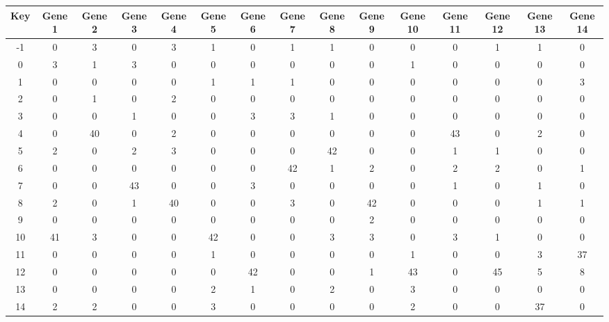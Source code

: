 \begin{tabular}{|c|c|c|c|c|c|c|c|c|c|c|c|c|c|c|}
\hline
Key & Gene 1 & Gene 2 & Gene 3 & Gene 4 & Gene 5 & Gene 6 & Gene 7 & Gene 8 & Gene 9 & Gene 10 & Gene 11 & Gene 12 & Gene 13 & Gene 14 \\
\hline
-1 & 0 & 3 & 0 & 3 & 1 & 0 & 1 & 1 & 0 & 0 & 0 & 1 & 1 & 0 \\
0 & 3 & 1 & 3 & 0 & 0 & 0 & 0 & 0 & 0 & 1 & 0 & 0 & 0 & 0 \\
1 & 0 & 0 & 0 & 0 & 1 & 1 & 1 & 0 & 0 & 0 & 0 & 0 & 0 & 3 \\
2 & 0 & 1 & 0 & 2 & 0 & 0 & 0 & 0 & 0 & 0 & 0 & 0 & 0 & 0 \\
3 & 0 & 0 & 1 & 0 & 0 & 3 & 3 & 1 & 0 & 0 & 0 & 0 & 0 & 0 \\
4 & 0 & 40 & 0 & 2 & 0 & 0 & 0 & 0 & 0 & 0 & 43 & 0 & 2 & 0 \\
5 & 2 & 0 & 2 & 3 & 0 & 0 & 0 & 42 & 0 & 0 & 1 & 1 & 0 & 0 \\
6 & 0 & 0 & 0 & 0 & 0 & 0 & 42 & 1 & 2 & 0 & 2 & 2 & 0 & 1 \\
7 & 0 & 0 & 43 & 0 & 0 & 3 & 0 & 0 & 0 & 0 & 1 & 0 & 1 & 0 \\
8 & 2 & 0 & 1 & 40 & 0 & 0 & 3 & 0 & 42 & 0 & 0 & 0 & 1 & 1 \\
9 & 0 & 0 & 0 & 0 & 0 & 0 & 0 & 0 & 2 & 0 & 0 & 0 & 0 & 0 \\
10 & 41 & 3 & 0 & 0 & 42 & 0 & 0 & 3 & 3 & 0 & 3 & 1 & 0 & 0 \\
11 & 0 & 0 & 0 & 0 & 1 & 0 & 0 & 0 & 0 & 1 & 0 & 0 & 3 & 37 \\
12 & 0 & 0 & 0 & 0 & 0 & 42 & 0 & 0 & 1 & 43 & 0 & 45 & 5 & 8 \\
13 & 0 & 0 & 0 & 0 & 2 & 1 & 0 & 2 & 0 & 3 & 0 & 0 & 0 & 0 \\
14 & 2 & 2 & 0 & 0 & 3 & 0 & 0 & 0 & 0 & 2 & 0 & 0 & 37 & 0 \\
\hline
\end{tabular}
